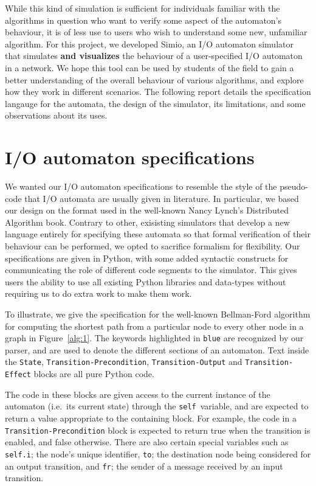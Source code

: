 \documentclass{scrartcl}
\def \kw#1{\texttt{\color{MidnightBlue}#1}}
\def \self {\texttt{\color{Cerulean}self}}
\begin{document}
While this kind of simulation is sufficient for individuals familiar with the
algorithms in question who want to verify some aspect of the automaton's
behaviour, it is of less use to users who wish to understand some new,
unfamiliar algorithm. For this project, we developed Simio, an I/O automaton
simulator that simulates \textbf{and visualizes} the behaviour of a
user-specified I/O automaton in a network. We hope this tool can be used by
students of the field to gain a better understanding of the overall behaviour
of various algorithms, and explore how they work in different scenarios. The
following report details the specification langauge for the automata, the
design of the simulator, its limitations, and some observations about its uses.

\section{I/O automaton specifications}
We wanted our I/O automaton specifications to resemble the style of the
pseudo-code that I/O automata are usually given in literature. In particular,
we based our design on the format used in the well-known Nancy Lynch's
Distributed Algorithm book\cite{book}. Contrary to other, exisisting simulators
that develop a new language entirely for specifying these automata so that
formal verification of their behaviour can be performed, we opted to sacrifice
formalism for flexibility. Our specifications are given in Python, with some
added syntactic constructs for communicating the role of different code
segments to the simulator. This gives users the ability to use all existing
Python libraries and data-types without requiring us to do extra work to make
them work.

To illustrate, we give the specification for the well-known Bellman-Ford
algorithm for computing the shortest path from a particular node to every other
node in a graph in Figure~\ref{alg:1}. The keywords highlighted in \kw{blue}
are recognized by our parser, and are used to denote the different sections of
an automaton. Text inside the \kw{State}, \kw{Transition-Precondition},
\kw{Transition-Output} and \kw{Transition-Effect} blocks are all pure Python
code.

The code in these blocks are given access to the current instance of the
automaton (i.e.\ its current state) through the \self\ variable, and are
expected to return a value appropriate to the containing block. For example,
the code in a \kw{Transition-Precondition} block is expected to return true
when the transition is enabled, and false otherwise. There are also certain
special variables such as \kw{self.i}; the node's unique identifier, \kw{to};
the destination node being considered for an output transition, and \kw{fr};
the sender of a message received by an input transition.
\end{document}
